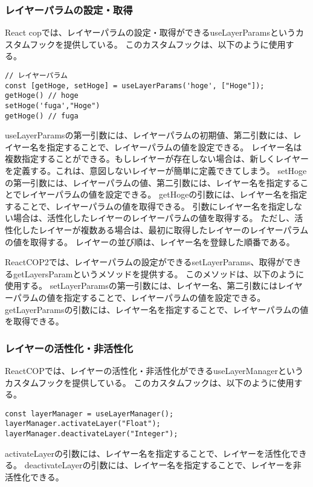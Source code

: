 \documentclass{jsarticle}
\begin{document}
\subsubsection{レイヤーパラムの設定・取得}
React copでは、レイヤーパラムの設定・取得ができるuseLayerParamsというカスタムフックを提供している。
このカスタムフックは、以下のように使用する。
\begin{lstlisting}[]      
// レイヤーパラム
const [getHoge, setHoge] = useLayerParams('hoge', ["Hoge"]);
getHoge() // hoge
setHoge('fuga',"Hoge")
getHoge() // fuga

\end{lstlisting}
useLayerParamsの第一引数には、レイヤーパラムの初期値、第二引数には、レイヤー名を指定することで、レイヤーパラムの値を設定できる。
レイヤー名は複数指定することができる。もしレイヤーが存在しない場合は、新しくレイヤーを定義する。これは、意図しないレイヤーが簡単に定義できてしまう。
setHogeの第一引数には、レイヤーパラムの値、第二引数には、レイヤー名を指定することでレイヤーパラムの値を設定できる。
getHogeの引数には、レイヤー名を指定することで、レイヤーパラムの値を取得できる。
引数にレイヤー名を指定しない場合は、活性化したレイヤーのレイヤーパラムの値を取得する。
ただし、活性化したレイヤーが複数ある場合は、最初に取得したレイヤーのレイヤーパラムの値を取得する。
レイヤーの並び順は、レイヤー名を登録した順番である。

ReactCOP2では、レイヤーパラムの設定ができるsetLayerParams、取得ができるgetLayersParamというメソッドを提供する。
このメソッドは、以下のように使用する。
setLayerParamsの第一引数には、レイヤー名、第二引数にはレイヤーパラムの値を指定することで、レイヤーパラムの値を設定できる。
getLayerParamsの引数には、レイヤー名を指定することで、レイヤーパラムの値を取得できる。

\subsubsection{レイヤーの活性化・非活性化}
ReactCOPでは、レイヤーの活性化・非活性化ができるuseLayerManagerというカスタムフックを提供している。
このカスタムフックは、以下のように使用する。
\begin{lstlisting}[]
const layerManager = useLayerManager();
layerManager.activateLayer("Float");
layerManager.deactivateLayer("Integer");
\end{lstlisting}
activateLayerの引数には、レイヤー名を指定することで、レイヤーを活性化できる。
deactivateLayerの引数には、レイヤー名を指定することで、レイヤーを非活性化できる。
\end{document}
